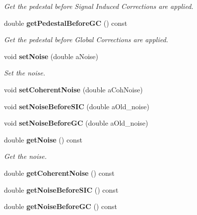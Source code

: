 \begin{DoxyCompactItemize}
\begin{DoxyCompactList}\small\item\em Get the pedestal before Signal Induced Corrections are applied. \end{DoxyCompactList}\item 
double {\bf get\-Pedestal\-Before\-G\-C} () const \label{classCALICE_1_1NoiseParameter_a2075113211efc4ce905ad6698775b9ed}

\begin{DoxyCompactList}\small\item\em Get the pedestal before Global Corrections are applied. \end{DoxyCompactList}\item 
void {\bf set\-Noise} (double a\-Noise)\label{classCALICE_1_1NoiseParameter_aa887925f83397f287cad1cf77f5beb5f}

\begin{DoxyCompactList}\small\item\em Set the noise. \end{DoxyCompactList}\item 
void {\bfseries set\-Coherent\-Noise} (double a\-Coh\-Noise)\label{classCALICE_1_1NoiseParameter_a8cab49decf1acc0c958d8b2c4f4135ce}

\item 
void {\bfseries set\-Noise\-Before\-S\-I\-C} (double a\-Old\-\_\-noise)\label{classCALICE_1_1NoiseParameter_ac4acc09827523e318148775dc1334fdb}

\item 
void {\bfseries set\-Noise\-Before\-G\-C} (double a\-Old\-\_\-noise)\label{classCALICE_1_1NoiseParameter_a2db1c2d78cea0327da44aea672a846a4}

\item 
double {\bf get\-Noise} () const 
\begin{DoxyCompactList}\small\item\em Get the noise. \end{DoxyCompactList}\item 
double {\bfseries get\-Coherent\-Noise} () const \label{classCALICE_1_1NoiseParameter_a5a63ace1e424cac33ceccc67d15625b9}

\item 
double {\bfseries get\-Noise\-Before\-S\-I\-C} () const \label{classCALICE_1_1NoiseParameter_a070e69c9ab4182aff016923bccd1e0f8}

\item 
double {\bfseries get\-Noise\-Before\-G\-C} () const \label{classCALICE_1_1NoiseParameter_a92bc44cb2669afeffc46dbbc297c8891}


\end{DoxyCompactItemize}

